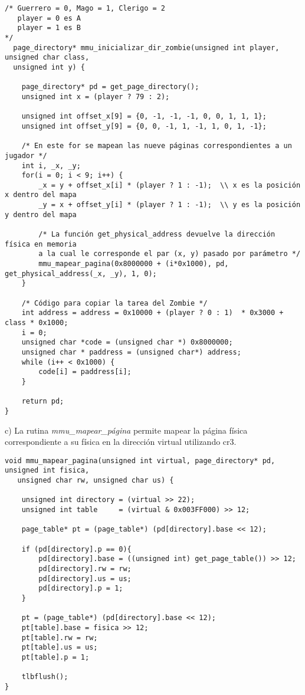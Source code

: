 \documentclass[a4paper]{article}
\begin{document}
\begin{codesnippet}
\begin{verbatim}
/* Guerrero = 0, Mago = 1, Clerigo = 2
   player = 0 es A
   player = 1 es B
*/
  page_directory* mmu_inicializar_dir_zombie(unsigned int player, unsigned char class, 
  unsigned int y) {

    page_directory* pd = get_page_directory();
    unsigned int x = (player ? 79 : 2);

    unsigned int offset_x[9] = {0, -1, -1, -1, 0, 0, 1, 1, 1};
    unsigned int offset_y[9] = {0, 0, -1, 1, -1, 1, 0, 1, -1};

    /* En este for se mapean las nueve páginas correspondientes a un jugador */
    int i, _x, _y;
    for(i = 0; i < 9; i++) {
        _x = y + offset_x[i] * (player ? 1 : -1);  \\ x es la posición x dentro del mapa
        _y = x + offset_y[i] * (player ? 1 : -1);  \\ y es la posición y dentro del mapa

        /* La función get_physical_address devuelve la dirección física en memoria
        a la cual le corresponde el par (x, y) pasado por parámetro */      
        mmu_mapear_pagina(0x8000000 + (i*0x1000), pd, get_physical_address(_x, _y), 1, 0);      
    }

    /* Código para copiar la tarea del Zombie */
    int address = address = 0x10000 + (player ? 0 : 1)  * 0x3000 + class * 0x1000;
    i = 0;
    unsigned char *code = (unsigned char *) 0x8000000;
    unsigned char * paddress = (unsigned char*) address;
    while (i++ < 0x1000) {
        code[i] = paddress[i];
    }
    
    return pd;
}
\end{verbatim}
\end{codesnippet}



{\large c)} La rutina \textit{mmu_mapear_p\'agina} permite mapear la p\'agina f\'isica correspondiente a su f\'isica en la direcci\'on virtual utilizando cr3.

\begin{codesnippet}
\begin{verbatim}
void mmu_mapear_pagina(unsigned int virtual, page_directory* pd, unsigned int fisica, 
   unsigned char rw, unsigned char us) {

    unsigned int directory = (virtual >> 22);
    unsigned int table     = (virtual & 0x003FF000) >> 12;

    page_table* pt = (page_table*) (pd[directory].base << 12);

    if (pd[directory].p == 0){
        pd[directory].base = ((unsigned int) get_page_table()) >> 12;
        pd[directory].rw = rw;
	    pd[directory].us = us;
        pd[directory].p = 1;
    }

    pt = (page_table*) (pd[directory].base << 12);
    pt[table].base = fisica >> 12;
    pt[table].rw = rw;
    pt[table].us = us;
    pt[table].p = 1;

    tlbflush();
}
\end{verbatim}
\end{codesnippet}
\end{document}
